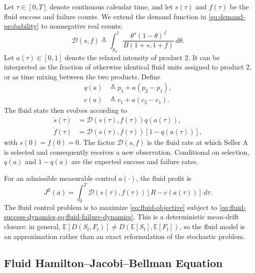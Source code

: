 \documentclass[opre]{informs3}
\newcommand{\E}{\mathbb{E}}
\begin{document}
Let $\tau\in[0,T]$ denote continuous calendar time, and let $s(\tau)$ and
$f(\tau)$ be the fluid success and failure counts. We extend the demand function
in \cref{eq:demand-probability} to nonnegative real counts:
\begin{equation}
    \mathcal{D}(s,f)
    \triangleq
    \int_{p_0}^{1}
    \frac{\theta^s(1-\theta)^f}{B(1+s,1+f)}\,d\theta.
    \label{eq:fluid-demand}
\end{equation}
Let $a(\tau)\in[0,1]$ denote the relaxed intensity of product 2. It can be
interpreted as the fraction of otherwise identical fluid units assigned to
product 2, or as time mixing between the two products. Define
\begin{align}
    q(a) &\triangleq p_1+a(p_2-p_1), \label{eq:fluid-quality}\\
    c(a) &\triangleq c_1+a(c_2-c_1). \label{eq:fluid-cost}
\end{align}
The fluid state then evolves according to
\begin{align}
    \dot{s}(\tau)
    &=
    \mathcal{D}(s(\tau),f(\tau))q(a(\tau)),
    \label{eq:fluid-success-dynamics}\\
    \dot{f}(\tau)
    &=
    \mathcal{D}(s(\tau),f(\tau))[1-q(a(\tau))],
    \label{eq:fluid-failure-dynamics}
\end{align}
with $s(0)=f(0)=0$. The factor $\mathcal{D}(s,f)$ is the fluid rate at which
Seller A is selected and consequently receives a new observation. Conditional
on selection, $q(a)$ and $1-q(a)$ are the expected success and failure rates.

For an admissible measurable control $a(\cdot)$, the fluid profit is
\begin{equation}
    J^{\mathrm{fl}}(a)
    =
    \int_0^T
    \mathcal{D}(s(\tau),f(\tau))
    [R-c(a(\tau))]\,d\tau.
    \label{eq:fluid-objective}
\end{equation}
The fluid control problem is to maximize \cref{eq:fluid-objective} subject to
\cref{eq:fluid-success-dynamics,eq:fluid-failure-dynamics}. This is a
deterministic mean-drift closure: in general,
$\E[D(S_t,F_t)]\neq D(\E[S_t],\E[F_t])$, so the fluid model is an approximation
rather than an exact reformulation of the stochastic problem.

\subsection{Fluid Hamilton--Jacobi--Bellman Equation}
\end{document}
